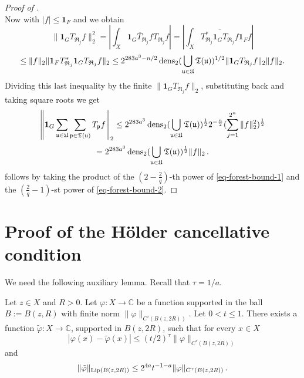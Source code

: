 \begin{proof}[Proof of ]
$$    $$
    Now with $|f| \le \mathbf{1}_F$ and  we obtain
    $$
        \| \mathbf{1}_G T_{\mathfrak{R}_j} f \|_2^2 = \left| \int_X \overline{\mathbf{1}_G T_{\mathfrak{R}_j} f} T_{\mathfrak{R}_j} f \right| = \left| \int_X \overline{T_{\mathfrak{R}_j}^* \mathbf{1}_G T_{\mathfrak{R}_j} f} \mathbf{1}_F f \right|
    $$
    $$
        \le \|f\|_2 \| \mathbf{1}_F T_{\mathfrak{R}_j}^* \mathbf{1}_G T_{\mathfrak{R}_j} f \|_2 \le 2^{283a^3-n/2} \operatorname{\operatorname{dens}}_2(\bigcup_{{\mathfrak u}\in {\mathfrak U}}{\mathfrak T}({\mathfrak u}))^{1/2} \| \mathbf{1}_G T_{\mathfrak{R}_j} f \|_2 \|f\|_2.
    $$
    Dividing this last inequality by the finite $\| \mathbf{1}_G T_{\mathfrak{R}_j} f \|_2$, substituting back and taking square roots we get
    $$
        \left\|\mathbf{1}_G \sum_{{\mathfrak u} \in {\mathfrak U}} \sum_{{\mathfrak p} \in {\mathfrak T}({\mathfrak u})} T_{{\mathfrak p}} f\right\|_2 \le 2^{283a^3} \operatorname{\operatorname{dens}}_2(\bigcup_{{\mathfrak u}\in {\mathfrak U}}{\mathfrak T}({\mathfrak u}))^{\frac{1}{2}} 2^{-\frac{n}{2}} (\sum_{j = 1}^{2^n} \|f\|_2^2)^{\frac{1}{2}}
    $$
    \begin{equation}
        \label{eq-forest-bound-2}
        = 2^{283a^3} \operatorname{\operatorname{dens}}_2(\bigcup_{{\mathfrak u}\in {\mathfrak U}}{\mathfrak T}({\mathfrak u}))^{\frac{1}{2}} \|f\|_2\,.
    \end{equation}
     follows by taking the product of the $(2 - \frac{2}{q})$-th power of \eqref{eq-forest-bound-1} and the $(\frac{2}{q} - 1)$-st power of \eqref{eq-forest-bound-2}.
\end{proof}

\section{Proof of the H\"older cancellative condition}
\label{liphoel}

We need the following auxiliary lemma.
Recall that $\tau = 1/a$.

\begin{lemma}
    \label{Lipschitz-Holder-approximation}
    \leanok
    Let $z\in X$ and $R>0$. Let $\varphi: X \to \mathbb{C}$ be a function supported in the ball
    $B:=B(z,R)$ with finite norm $\|\varphi\|_{C^\tau(B(z, 2R))}$.
    Let $0<t \leq 1$. There exists a function $\tilde \varphi : X \to \mathbb{C}$, supported in $B(z,2R)$, such that for every $x\in X$
    \begin{equation}\label{eq-firstt}
        |\varphi(x) - \tilde \varphi(x)| \leq (t/2)^{\tau} \|\varphi\|_{C^\tau(B(z,2R))}
    \end{equation}and
   \begin{equation}\label{eq-secondt}
       \|\tilde \varphi\|_{\operatorname{\operatorname{Lip}}(B(z,2R))} \leq 2^{4a}t^{-1-a} \|\varphi\|_{C^{\tau}(B(z,2R))}\, .
   \end{equation}
\end{lemma}


